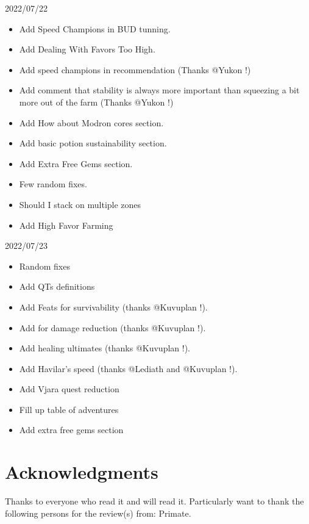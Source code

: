 \documentclass{article}
\begin{document}
2022/07/22 
\begin{itemize}
    \item Add Speed Champions in BUD tunning.
    \item Add Dealing With Favors Too High.
    \item Add speed champions in recommendation (Thanks @Yukon !)
    \item Add comment that stability is always more important than squeezing a bit more out of the farm (Thanks @Yukon !)
    \item Add How about Modron cores section.
    \item Add basic potion sustainability section.
    \item Add Extra Free Gems section.
    \item Few random fixes.
    \item Should I stack on multiple zones
    \item Add High Favor Farming
\end{itemize}
2022/07/23
\begin{itemize}
    \item Random fixes
    \item Add QTs definitions
    \item Add Feats for survivability (thanks @Kuvuplan !).
    \item Add \selise for damage reduction (thanks @Kuvuplan !).
    \item Add healing ultimates (thanks @Kuvuplan !).
    \item Add Havilar's speed (thanks @Lediath and @Kuvuplan !).
    \item Add Vjara quest reduction
    \item Fill up table of adventures
    \item Add extra free gems section
\end{itemize}
    
\section{Acknowledgments}

Thanks to everyone who read it and will read it.
Particularly want to thank the following persons for the review(s) from: Primate.
\end{document}

